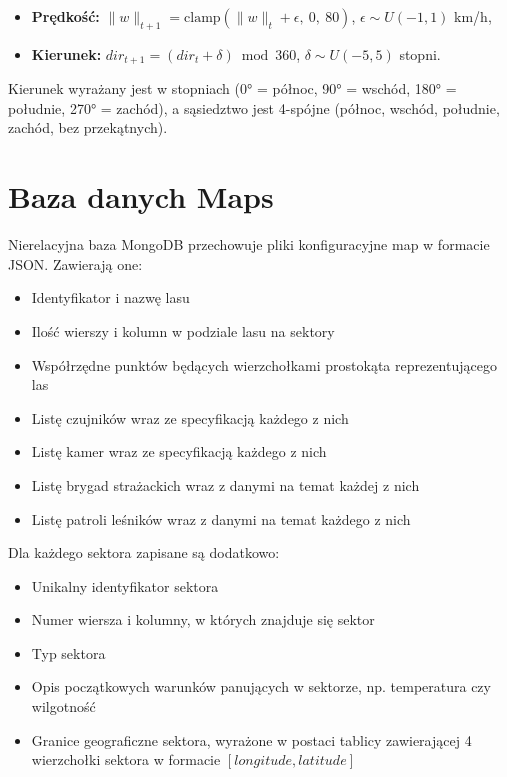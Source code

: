 \documentclass[11pt,a4paper]{article}
\begin{document}
\begin{itemize}
    \item \textbf{Prędkość:} $\|w\|_{t+1} = \mathrm{clamp}(\|w\|_t + \epsilon,\ 0,\ 80)$, $\epsilon \sim U(-1, 1)$ km/h,
    \item \textbf{Kierunek:} $dir_{t+1} = (dir_t + \delta) \bmod 360$, $\delta \sim U(-5, 5)$ stopni.
\end{itemize}

Kierunek wyrażany jest w stopniach (0° = północ, 90° = wschód, 180° = południe, 270° = zachód), a sąsiedztwo jest 4-spójne (północ, wschód, południe, zachód, bez przekątnych).

\section{Baza danych Maps}

Nierelacyjna baza MongoDB przechowuje pliki konfiguracyjne map w formacie JSON. Zawierają one:
\begin{itemize}
    \item Identyfikator i nazwę lasu
    \item Ilość wierszy i kolumn w podziale lasu na sektory
    \item Współrzędne punktów będących wierzchołkami prostokąta reprezentującego las
    \item Listę czujników wraz ze specyfikacją każdego z nich
    \item Listę kamer wraz ze specyfikacją każdego z nich
    \item Listę brygad strażackich wraz z danymi na temat każdej z nich
    \item Listę patroli leśników wraz z danymi na temat każdego z nich
\end{itemize}

Dla każdego sektora zapisane są dodatkowo:
\begin{itemize}
    \item Unikalny identyfikator sektora
    \item Numer wiersza i kolumny, w których znajduje się sektor
    \item Typ sektora
    \item Opis początkowych warunków panujących w sektorze, np. temperatura czy wilgotność
    \item Granice geograficzne sektora, wyrażone w postaci tablicy zawierającej 4 wierzchołki sektora w formacie \([longitude, latitude]\)
\end{itemize}
\end{document}
